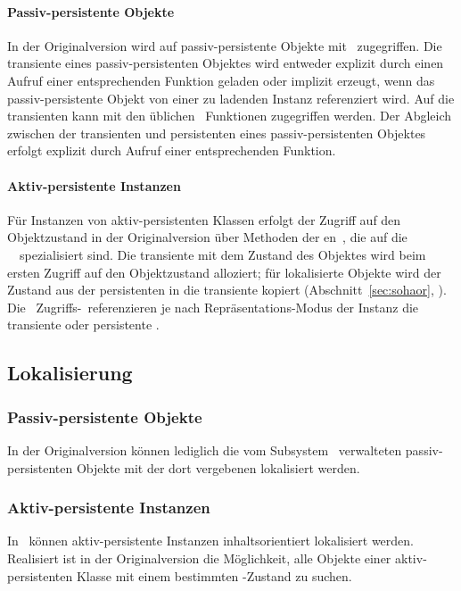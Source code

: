 \paragraph{Passiv-persistente Objekte}
%
In der Originalversion wird auf passiv-persistente Objekte mit
\swizzling\ zugegriffen.  Die transiente \representation{} eines
passiv-persistenten Objektes wird entweder explizit durch einen Aufruf
einer entsprechenden Funktion geladen oder implizit erzeugt, wenn das
passiv-persistente Objekt von einer zu ladenden Instanz referenziert
wird. Auf die transienten \representations{} kann mit den \"{u}blichen
\cl\ Funktionen zugegriffen werden. Der Abgleich zwischen der
transienten und persistenten \representation{} eines
passiv-persistenten Objektes erfolgt explizit durch Aufruf einer
entsprechenden Funktion.
%
\paragraph{Aktiv-persistente Instanzen}
%
F\"{u}r Instanzen von aktiv-persistenten Klassen erfolgt der Zugriff auf
den Objektzustand in der Originalversion \"{u}ber Methoden der
\gfn[n]en\ , die auf die
\clsmc\ \ spezialisiert sind.
Die transiente \representation{} mit dem Zustand des Objektes wird
beim ersten Zugriff auf den Objektzustand alloziert; f\"{u}r lokalisierte
Objekte wird der Zustand aus der persistenten in 
die transiente \representation{} kopiert (Abschnitt~\ref{sec:sohaor},
\citepage{\pageref{sec:sohaor}}). Die
\spc[n]\ Zugriffs-\mtd[n]\ referenzieren je nach
Repr\"{a}sentations-Modus der Instanz die transiente oder persistente
\representation.
%
\subsection{Lokalisierung}%
\label{sec:sohloc}%
%
\subsubsection{Passiv-persistente Objekte}
%
In der Originalversion k\"{o}nnen lediglich die vom Subsystem
\store\ verwalteten pas\-siv-per\-si\-sten\-ten Objekte mit der dort
vergebenen \objid\/ lokalisiert werden.
%
\subsubsection{Aktiv-persistente Instanzen}
%
In \soh\ k\"{o}nnen aktiv-persistente Instanzen inhaltsorientiert
lokalisiert werden. Realisiert ist in der Originalversion die
M\"{o}glichkeit, alle Objekte einer aktiv-persistenten Klasse mit einem
bestimmten \Slt-Zustand zu suchen.
%
%
%
